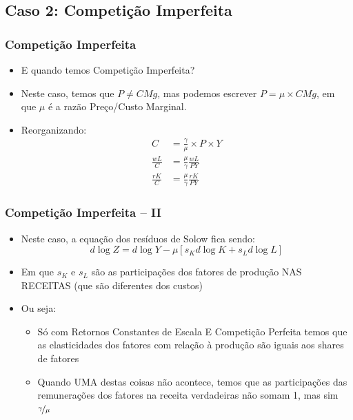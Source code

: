 \documentclass{beamer}
\begin{document}
\subsection{Caso 2: Competição Imperfeita}
\begin{frame}[fragile]\frametitle{Competição Imperfeita}
    \begin{itemize}
        \item E quando temos Competição Imperfeita?
        \item Neste caso, temos que $P \neq CMg$, mas podemos escrever $P=\mu \times CMg$, em que $\mu$ é a razão Preço/Custo Marginal.
        \item Reorganizando:
        \begin{align*}
            C&=\frac{\gamma}{\mu}\times P \times Y \\
            \frac{wL}{C}&=\frac{\mu}{\gamma}\frac{wL}{PY} \\
            \frac{rK}{C}&=\frac{\mu}{\gamma}\frac{rK}{PY}
        \end{align*}
    \end{itemize}


\end{frame}
\begin{frame}[fragile]\frametitle{Competição Imperfeita -- II}
    \begin{itemize}
        \item Neste caso, a equação dos resíduos de Solow fica sendo:
        \begin{equation}
            d\log{Z}=d\log{Y}-\mu \left [s_K d\log{K} + s_L d\log{L} \right]
        \end{equation}
        \item Em que $s_K$ e $s_L$ são as participações dos fatores de produção NAS RECEITAS (que são diferentes dos custos)
        \item Ou seja:
            \begin{itemize}
                \item Só com Retornos Constantes de Escala E Competição Perfeita temos que as elasticidades dos fatores com relação à produção são iguais aos shares de fatores
                \item Quando UMA destas coisas não acontece, temos que as participações das remunerações dos fatores na receita verdadeiras não somam 1, mas sim $\nicefrac{\gamma}{\mu}$ 
            \end{itemize}
    \end{itemize}


\end{frame}
\end{document}
